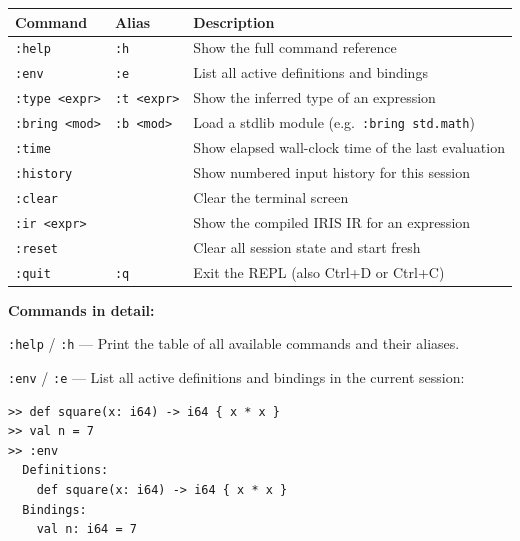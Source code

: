 \documentclass[
  english,
]{book}
\begin{document}
\begin{longtable}[]{@{}
  >{\raggedright\arraybackslash}p{}
  >{\raggedright\arraybackslash}p{}
  >{\raggedright\arraybackslash}p{}@{}}
\toprule\noalign{}
\begin{minipage}[b]{\linewidth}\raggedright
Command
\end{minipage} & \begin{minipage}[b]{\linewidth}\raggedright
Alias
\end{minipage} & \begin{minipage}[b]{\linewidth}\raggedright
Description
\end{minipage} \\
\midrule\noalign{}
\endhead
\bottomrule\noalign{}
\endlastfoot
\texttt{:help} & \texttt{:h} & Show the full command reference \\
\texttt{:env} & \texttt{:e} & List all active definitions and
bindings \\
\texttt{:type\ \textless{}expr\textgreater{}} &
\texttt{:t\ \textless{}expr\textgreater{}} & Show the inferred type of
an expression \\
\texttt{:bring\ \textless{}mod\textgreater{}} &
\texttt{:b\ \textless{}mod\textgreater{}} & Load a stdlib module
(e.g.~\texttt{:bring\ std.math}) \\
\texttt{:time} & & Show elapsed wall-clock time of the last
evaluation \\
\texttt{:history} & & Show numbered input history for this session \\
\texttt{:clear} & & Clear the terminal screen \\
\texttt{:ir\ \textless{}expr\textgreater{}} & & Show the compiled IRIS
IR for an expression \\
\texttt{:reset} & & Clear all session state and start fresh \\
\texttt{:quit} & \texttt{:q} & Exit the REPL (also Ctrl+D or Ctrl+C) \\
\end{longtable}

\textbf{Commands in detail:}

\texttt{:help} / \texttt{:h} --- Print the table of all available
commands and their aliases.

\texttt{:env} / \texttt{:e} --- List all active definitions and bindings
in the current session:

\begin{verbatim}
>> def square(x: i64) -> i64 { x * x }
>> val n = 7
>> :env
  Definitions:
    def square(x: i64) -> i64 { x * x }
  Bindings:
    val n: i64 = 7
\end{verbatim}
\end{document}
